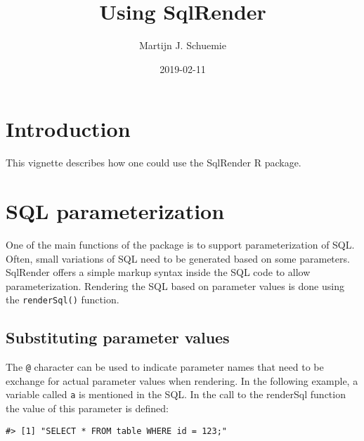 \documentclass[]{article}
\title{Using SqlRender}
\author{Martijn J. Schuemie}
\date{2019-02-11}
\newenvironment{Shaded}{\begin{snugshade}}{\end{snugshade}}
\newcommand{\DataTypeTok}[1]{\textcolor[rgb]{0.13,0.29,0.53}{#1}}
\newcommand{\DecValTok}[1]{\textcolor[rgb]{0.00,0.00,0.81}{#1}}
\newcommand{\KeywordTok}[1]{\textcolor[rgb]{0.13,0.29,0.53}{\textbf{#1}}}
\newcommand{\NormalTok}[1]{#1}
\newcommand{\OperatorTok}[1]{\textcolor[rgb]{0.81,0.36,0.00}{\textbf{#1}}}
\newcommand{\StringTok}[1]{\textcolor[rgb]{0.31,0.60,0.02}{#1}}
\begin{document}
\maketitle

{
\setcounter{tocdepth}{2}
\tableofcontents
}
\hypertarget{introduction}{%
\section{Introduction}\label{introduction}}

This vignette describes how one could use the SqlRender R package.

\hypertarget{sql-parameterization}{%
\section{SQL parameterization}\label{sql-parameterization}}

One of the main functions of the package is to support parameterization
of SQL. Often, small variations of SQL need to be generated based on
some parameters. SqlRender offers a simple markup syntax inside the SQL
code to allow parameterization. Rendering the SQL based on parameter
values is done using the \texttt{renderSql()} function.

\hypertarget{substituting-parameter-values}{%
\subsection{Substituting parameter
values}\label{substituting-parameter-values}}

The \texttt{@} character can be used to indicate parameter names that
need to be exchange for actual parameter values when rendering. In the
following example, a variable called \texttt{a} is mentioned in the SQL.
In the call to the renderSql function the value of this parameter is
defined:

\begin{Shaded}
\end{Shaded}

\begin{verbatim}
#> [1] "SELECT * FROM table WHERE id = 123;"
\end{verbatim}
\end{document}
